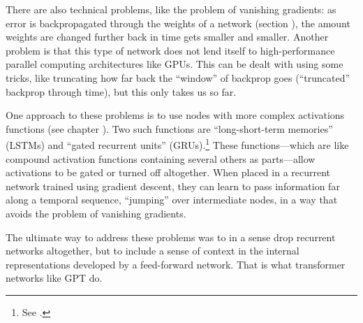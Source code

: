 There are also technical problems, like the problem of vanishing gradients: as error is backpropagated through the weights of a network (section ), the amount weights are changed further back in time gets smaller and smaller. Another problem is that this type of network does not lend itself to high-performance parallel computing architectures like GPUs. This can be dealt with using some tricks, like truncating how far back the ``window'' of backprop goes (``truncated'' backprop through time), but this only takes us so far.

One approach to these problems is to use nodes with more complex activations functions (see chapter ). Two such functions are ``long-short-term memories'' (LSTMs)  \cite{schmidhuber1997long, olah2015understanding} and ``gated recurrent units'' (GRUs).\footnote{See .} These functions---which are like compound activation functions containing several others as parts---allow activations to be gated or turned off altogether. When placed in a recurrent network trained using gradient descent, they can learn to pass information far along a temporal sequence, ``jumping'' over intermediate nodes, in a way that avoids the problem of vanishing gradients. 

The ultimate way to address these problems was to in a sense drop recurrent networks altogether, but to include a sense of context in the internal representations developed by a feed-forward network. That is what transformer networks like GPT do. 

